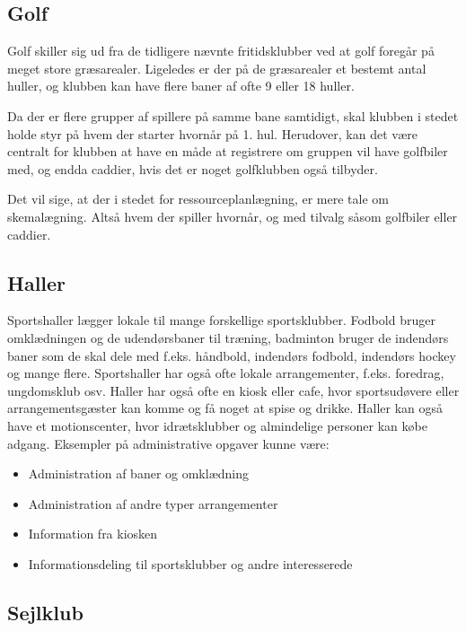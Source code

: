 \subsection{Golf}

Golf skiller sig ud fra de tidligere nævnte fritidsklubber ved at golf foregår på meget store græsarealer. Ligeledes er
der på de græsarealer et bestemt antal huller, og klubben kan have flere baner af ofte 9 eller 18 huller.

Da der er flere grupper af spillere på samme bane samtidigt, skal klubben i stedet holde styr på hvem der starter
hvornår på 1. hul. Herudover, kan det være centralt for klubben at have en måde at registrere om gruppen vil have
golfbiler med, og endda caddier, hvis det er noget golfklubben også tilbyder.

Det vil sige, at der i stedet for ressourceplanlægning, er mere tale om skemalægning. Altså hvem der spiller hvornår, og
med tilvalg såsom golfbiler eller caddier.


\subsection{Haller}

Sportshaller lægger lokale til mange forskellige sportsklubber. Fodbold bruger omklædningen og de udendørsbaner til
træning, badminton bruger de indendørs baner som de skal dele med f.eks. håndbold, indendørs fodbold, indendørs hockey
og mange flere. Sportshaller har også ofte lokale arrangementer, f.eks. foredrag, ungdomsklub osv. Haller har også ofte
en kiosk eller cafe, hvor sportsudøvere eller arrangementsgæster kan komme og få noget at spise og drikke. Haller kan
også have et motionscenter, hvor idrætsklubber og almindelige personer kan købe adgang\citep{spt_hal}. Eksempler på
administrative opgaver kunne være:

\begin{itemize}
\item Administration af baner og omklædning
\item Administration af andre typer arrangementer
\item Information fra kiosken
\item Informationsdeling til sportsklubber og andre interesserede
\end{itemize}

\subsection{Sejlklub}

